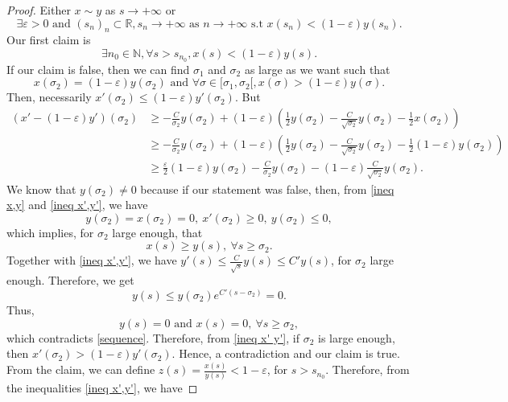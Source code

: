 \documentclass[11pt,a4paper]{article}
\newcommand{\1}{\mathbbm{1}}
\numberwithin{equation}{section}
\newcommand{\numberset}{\mathbb}
\newcommand{\N}{\numberset{N}}
\newcommand{\R}{\numberset{R}}
\theoremstyle{remark}
\begin{document}
\begin{proof}
Either $x\sim y$ as $s\rightarrow +\infty$ or 
\begin{equation}
\exists \varepsilon>0\text{ and }(s_n)_n\subset \R, s_n\rightarrow +\infty\text{ as }n\rightarrow +\infty \text{ s.t } x(s_n)<(1-\varepsilon) y(s_n).
\end{equation}
Our first claim is 
\begin{equation}\label{sequence}
\exists n_0\in \N, \forall s>s_{n_0}, x(s)<(1-\varepsilon)y(s).
\end{equation}
If our claim is false, then we can find $\sigma_1$ and $\sigma_2$ as large as we want such that 
$$x(\sigma_2)=(1-\varepsilon)y(\sigma_2) \text{ and } \forall \sigma\in [\sigma_1,\sigma_2[,x(\sigma)>(1-\varepsilon)y(\sigma).$$
Then, necessarily $x'(\sigma_2)\leq (1-\varepsilon)y'(\sigma_2).$ But 
\begin{equation}\label{ineq x' y'}
\begin{split}
(x'-(1-\varepsilon)y')(\sigma_2)&\geq -\frac{C}{\sigma_2}y(\sigma_2)+(1-\varepsilon)\left(\frac{1}{2}y(\sigma_2)-\frac{C}{\sqrt{\sigma_2}}y(\sigma_2)-\frac{1}{2}x(\sigma_2)\right)\\
&\geq -\frac{C}{\sigma_2}y(\sigma_2)+(1-\varepsilon)\left(\frac{1}{2}y(\sigma_2)-\frac{C}{\sqrt{\sigma_2}}y(\sigma_2)-\frac{1}{2}(1-\varepsilon)y(\sigma_2)\right)\\
&\geq \frac{\varepsilon}{2}(1-\varepsilon) y(\sigma_2)-\frac{C}{\sigma_2}y(\sigma_2)-(1-\varepsilon)\frac{C}{\sqrt{\sigma_2}}y(\sigma_2).
\end{split}
\end{equation}
We know that $y(\sigma_2)\neq 0$ because if our statement was false, then, from \eqref{ineq x,y} and \eqref{ineq x',y'}, we have
$$y(\sigma_2)=x(\sigma_2)=0,\ x'(\sigma_2)\geq 0,\ y(\sigma_2)\leq 0,$$
which implies, for $\sigma_2$ large enough, that
$$x(s)\geq y(s),\ \forall s\geq \sigma_2.$$
Together with \eqref{ineq x',y'}, we have $y'(s)\leq \frac{C}{\sqrt{s}}y(s)\leq C'y(s)$, for $\sigma_2$ large enough. Therefore, we get 
$$y(s)\leq y(\sigma_2)e^{C'(s-\sigma_2)}=0.$$
Thus,
$$y(s)= 0 \text{ and } x(s)=0,\ \forall s\geq \sigma_2,$$
which contradicts \eqref{sequence}.	Therefore, from \eqref{ineq x' y'}, if $\sigma_2$ is large enough, then $x'(\sigma_2)>(1-\varepsilon)y'(\sigma_2)$. Hence, a contradiction and our claim is true.\\
From the claim, we can define $z(s)=\frac{x(s)}{y(s)}<1-\varepsilon$, for $s>s_{n_0}.$ Therefore, from the inequalities \eqref{ineq x',y'}, we have

\end{proof}
\end{document}
